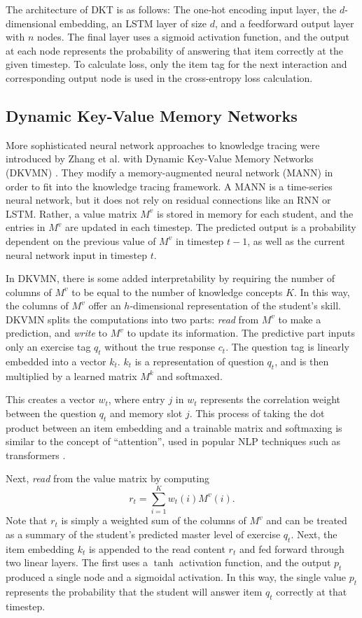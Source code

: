   The architecture of DKT is as follows: The one-hot encoding input layer, the $d$-dimensional embedding, an LSTM layer of size $d$, and a feedforward output layer with $n$ nodes. The final layer uses a sigmoid activation function, and the output at each node represents the probability of answering that item correctly at the given timestep. To calculate loss, only the item tag for the next interaction and corresponding output node is used in the cross-entropy loss calculation.

  \subsection{Dynamic Key-Value Memory Networks}\label{sec:dkvmn}
More sophisticated neural network approaches to knowledge tracing were introduced by Zhang et al. with Dynamic Key-Value Memory Networks (DKVMN) \cite{zhang2017}. They modify a memory-augmented neural network (MANN) in order to fit into the knowledge tracing framework. A MANN is a time-series neural network, but it does not rely on residual connections like an RNN or LSTM. Rather, a value matrix $M^v$ is stored in memory for each student, and the entries in $M^v$ are updated in each timestep. The predicted output is a probability dependent on the previous value of $M^v$ in timestep $t-1$, as well as the current neural network input in timestep $t$.

In DKVMN, there is some added interpretability by requiring the number of columns of $M^v$ to be equal to the number of knowledge concepts $K$. In this way, the columns of $M^v$ offer an $h$-dimensional representation of the student's skill. DKVMN splits the computations into two parts: \textit{read} from $M^v$ to make a prediction, and \textit{write} to $M^v$ to update its information. The predictive part inputs only an exercise tag $q_t$ without the true response $c_t$. The question tag is linearly embedded into a vector $k_t$. $k_t$ is a representation of question $q_t$, and is then multiplied by a learned matrix $M^k$ and softmaxed. 

This creates a vector $w_t$, where entry $j$ in $w_t$ represents the correlation weight between the question $q_t$ and memory slot $j$. This process of taking the dot product between an item embedding and a trainable matrix and softmaxing is similar to the concept of ``attention'', used in popular NLP techniques such as transformers \cite{vaswani2017}.

Next, \textit{read} from the value matrix by computing 
\begin{equation}
  r_t = \sum_{i=1}^K w_t(i) M^v(i).
  \label{eq:dkvmn_read}
\end{equation}
Note that $r_t$ is simply a weighted sum of the columns of $M^v$ and can be treated as a summary of the student's predicted master level of exercise $q_t$. Next, the item embedding $k_t$ is appended to the read content $r_t$ and fed forward through two linear layers. The first uses a $\tanh$ activation function, and the output $p_t$ produced a single node and a sigmoidal activation. In this way, the single value $p_t$ represents the probability that the student will answer item $q_t$ correctly at that timestep.

